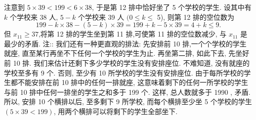 注意到 $5 \times 39<199<6 \times 38$, 于是第 12 排中恰好坐了 5 个学校的学生.
设其中有 $k$ 个学校来 38 人, $5-k$ 个学校来 39 人 $(0 \leqslant k \leqslant$ 5), 则第 12 排的空位数为
$$
199-k \times 38-(5-k) \times 39=199+k-5 \times 39=4+k \leqslant 9 .
$$
但 $x_{11} \geqslant 37$,将第 12 排的学生坐到第 11 排,可使第 11 排的空位数减少, 与 $x_{11}$ 是最少的矛盾.
注:: 我们还有一种更直观的排法: 先安排前 10 排,一个个学校的学生就座, 直至某行再坐不下任何一个学校的学生为止.
再坐第二排, 如此下去, 先坐好前 10 排.
我们来估计还剩下多少学校的学生没有安排座位.
不难知道, 没有就座的学校至多有 9 个.
否则, 至少有 10 所学校的学生没有安排座位.
由于每所学校的学生都不能安排在前 10 排中的任何一排就座, 这意味着剩下的任何一所学校的学生与前 10 排中任何一排坐的学生之和多于 199 个.
这样, 总人数就多于 1990 , 矛盾.
所以, 安排 10 个横排以后, 至多剩下 9 所学校, 而每个横排至少坐 5 个学校的学生 $(5 \times 39<199)$, 用两个横排可以将剩下的学生全部坐下.




